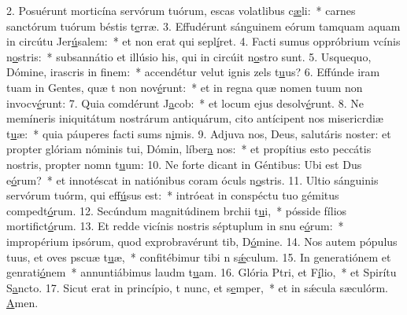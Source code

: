 2. Posuérunt morticína servórum tuórum, escas volatlibus c\uline{æ}li:~* carnes sanctórum tuórum béstis t\uline{e}rræ.
3. Effudérunt sánguinem eórum tamquam aquam in circútu Jer\uline{ú}salem:~* et non erat qui sepl\uline{í}ret.
4. Facti sumus oppróbrium vcínis n\uline{o}stris:~* subsannátio et illúsio his, qui in circúit n\uline{o}stro sunt.
5. Usquequo, Dómine, irascris in f\uline{i}nem:~* accendétur velut ignis zels t\uline{u}us?
6. Effúnde iram tuam in Gentes, quæ t non nov\uline{é}runt:~* et in regna quæ nomen tuum non invocv\uline{é}runt:
7. Quia comdérunt J\uline{a}cob:~* et locum ejus desolv\uline{é}runt.
8. Ne memíneris iniquitátum nostrárum antiquárum, cito antícipent nos misericrdiæ t\uline{u}æ:~* quia páuperes facti sums n\uline{i}mis.
9. Adjuva nos, Deus, salutáris noster: et propter glóriam nóminis tui, Dómin, líber\uline{a} nos:~* et propítius esto peccátis nostris, propter nomn t\uline{u}um:
10. Ne forte dicant in Géntibus: Ubi est Dus e\uline{ó}rum?~* et innotéscat in natiónibus coram óculs n\uline{o}stris.
11. Ultio sánguinis servórum tuórm, qui eff\uline{ú}sus est:~* intróeat in conspéctu tuo gémitus compedt\uline{ó}rum.
12. Secúndum magnitúdinem brchii t\uline{u}i,~* pósside fílios mortifict\uline{ó}rum.
13. Et redde vicínis nostris séptuplum in snu e\uline{ó}rum:~* impropérium ipsórum, quod exprobravérunt tib, D\uline{ó}mine.
14. Nos autem pópulus tuus, et oves pscuæ t\uline{u}æ,~* confitébimur tibi n s\uline{ǽ}culum.
15. In generatiónem et genrati\uline{ó}nem~* annuntiábimus laudm t\uline{u}am.
16. Glória Ptri, et F\uline{í}lio,~* et Spirítu S\uline{a}ncto.
17. Sicut erat in princípio, t nunc, et s\uline{e}mper,~* et in sǽcula sæculórm. \uline{A}men.

